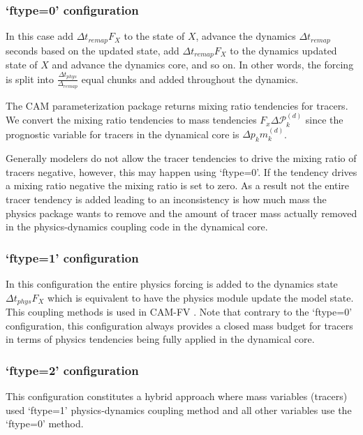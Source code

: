 \documentclass{agujournal}
\begin{document}
\subsubsection{`ftype=0' configuration}
In this case add $\Delta t_{remap}F_X$ to the state of $X$, advance the dynamics $\Delta t_{remap}$ seconds based on the updated state, add $\Delta t_{remap}F_X$ to the dynamics updated state of $X$ and advance the dynamics core, and so on. In other words, the forcing is split into $\frac{\Delta t_{phys}}{\Delta_{remap}}$ equal chunks and added throughout the dynamics. 

The CAM parameterization package returns mixing ratio tendencies for tracers. We convert the mixing ratio tendencies to mass tendencies $F_x \Delta \mathcal{P}^{(d)}_k$ since the prognostic variable for tracers in the dynamical core is $\Delta p_k m^{(d)}_k$.

Generally modelers do not allow the tracer tendencies to drive the mixing ratio of tracers negative, however, this may happen using `ftype=0'. If the tendency drives a mixing ratio negative the mixing ratio is set to zero. As a result not the entire tracer tendency is added leading to an inconsistency is how much mass the physics package wants to remove and the amount of tracer mass actually removed in the physics-dynamics coupling code in the dynamical core.
\subsubsection{`ftype=1' configuration}
In this configuration the entire physics forcing is added to the dynamics state $\Delta t_{phys}F_X$ which is equivalent to have the physics module update the model state. This coupling methods is used in CAM-FV \citep{L2004MWR}. Note that contrary to the `ftype=0' configuration, this configuration always provides a closed mass budget for tracers in terms of physics tendencies being fully applied in the dynamical core.
\subsubsection{`ftype=2' configuration}
This configuration constitutes a hybrid approach where mass variables (tracers) used `ftype=1' physics-dynamics coupling method and all other variables use the `ftype=0' method.


\end{document}

